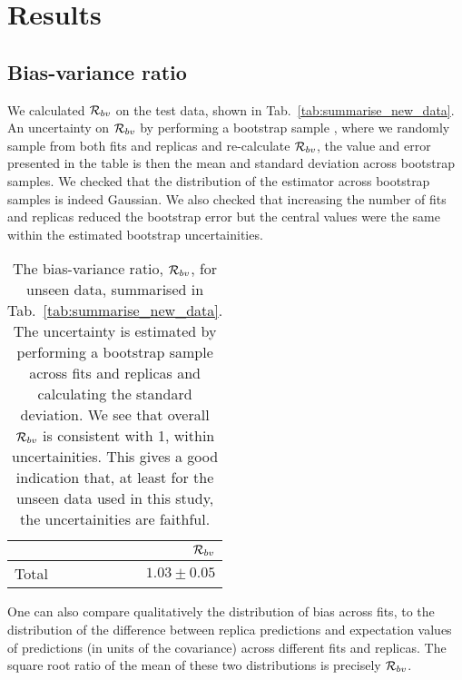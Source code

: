 \section{Results}

\subsection{Bias-variance ratio}

We calculated $\mathcal{R}_{bv}$ on the test data, shown in
Tab.~\ref{tab:summarise_new_data}. An
uncertainty on $\mathcal{R}_{bv}$ by performing a bootstrap sample
\cite{efron1994introduction},
where we randomly sample from both fits and replicas and re-calculate
$\mathcal{R}_{bv}$, the value and error presented in the table is then the mean
and standard deviation across bootstrap samples. We checked that the distribution
of the estimator across bootstrap samples is indeed Gaussian. We also checked
that increasing the number of fits and replicas reduced the bootstrap error but
the central values were the same within the estimated bootstrap uncertainities.

\begin{table}[hb]
    \begin{center}
        \begin{tabular}{lr}
            \toprule
            {}     &  $\mathcal{R}_{bv}$ \\
            \midrule
            Total  &  $1.03\pm0.05$   \\
            \bottomrule
            \end{tabular}
    \end{center}
    \caption{
        The bias-variance ratio, $\mathcal{R}_{bv}$, for unseen data, summarised in
        Tab.~\ref{tab:summarise_new_data}. The uncertainty is estimated by
        performing a bootstrap sample across fits and replicas and calculating
        the standard deviation. We see that overall $\mathcal{R}_{bv}$ is consistent
        with 1, within uncertainities. This gives a good indication that, at least
        for the unseen data used in this study, the uncertainities are faithful.
    }
    \label{tab:biasvarratio}
\end{table}

One can also compare qualitatively the distribution of bias across fits, to the
distribution of the difference between replica predictions and expectation
values of predictions (in units of the covariance) across different fits
and replicas. The square root ratio of the mean of these two distributions
is precisely $\mathcal{R}_{bv}$.

